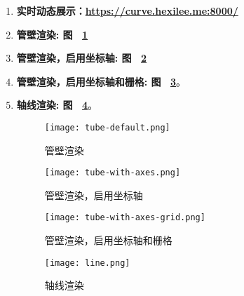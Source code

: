 \cleardoublepage


\begin{enumerate}

\item \textbf{实时动态展示：\href{https://curve.hexilee.me:8000/}{https://curve.hexilee.me:8000/}}

\item \textbf{管壁渲染: 图 ~\ref{fig:tube-default}}

\item \textbf{管壁渲染，启用坐标轴: 图 ~\ref{fig:tube-with-axes}}

\item \textbf{管壁渲染，启用坐标轴和栅格: 图 ~\ref{fig:tube-with-axes-grid}}。

\item \textbf{轴线渲染: 图 ~\ref{fig:line}}。

\begin{figure}[H]
\centering
\texttt{[image: tube-default.png]}
\caption{管壁渲染}
\label{fig:tube-default}
\end{figure}

\begin{figure}[H]
\centering
\texttt{[image: tube-with-axes.png]}
\caption{管壁渲染，启用坐标轴}
\label{fig:tube-with-axes}
\end{figure}

\begin{figure}[H]
\centering
\texttt{[image: tube-with-axes-grid.png]}
\caption{管壁渲染，启用坐标轴和栅格}
\label{fig:tube-with-axes-grid}
\end{figure}

\begin{figure}[H]
\centering
\texttt{[image: line.png]}
\caption{轴线渲染}
\label{fig:line}
\end{figure}

\end{enumerate}
